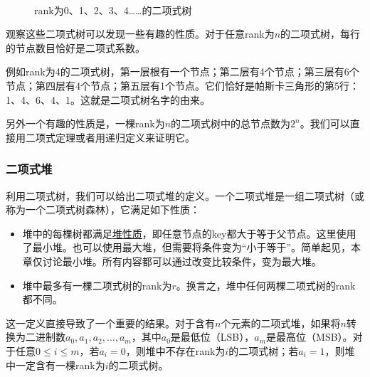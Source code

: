 \documentclass[UTF8]{article}
\begin{document}
\begin{figure}[htbp]
  \centering
   \\
  \caption{rank为0、1、2、3、4……的二项式树} \label{fig:bitree-forms}
\end{figure}

观察这些二项式树可以发现一些有趣的性质。对于任意rank为$n$的二项式树，每行的节点数目恰好是二项式系数。

例如rank为4的二项式树，第一层根有一个节点；第二层有4个节点；第三层有6个节点；第四层有4个节点；第五层有1个节点。它们恰好是帕斯卡三角形的第5行：1、4、6、4、1。这就是二项式树名字的由来。

另外一个有趣的性质是，一棵rank为$n$的二项式树中的总节点数为$2^n$。我们可以直接用二项式定理或者用递归定义来证明它。

\subsubsection{二项式堆}
\label{Binomial heap} 

利用二项式树，我们可以给出二项式堆的定义。一个二项式堆是一组二项式树（或称为一个二项式树森林），它满足如下性质：

\begin{itemize}
\item 堆中的每棵树都满足\underline{堆性质}，即任意节点的key都大于等于父节点。这里使用了最小堆。也可以使用最大堆，但需要将条件变为“小于等于”。简单起见，本章仅讨论最小堆。所有内容都可以通过改变比较条件，变为最大堆。
\item 堆中最多有一棵二项式树的rank为$r$。换言之，堆中任何两棵二项式树的rank都不同。
\end{itemize}

这一定义直接导致了一个重要的结果。对于含有$n$个元素的二项式堆，如果将$n$转换为二进制数$a_0, a_1, a_2, ..., a_m$，其中$a_0$是最低位（LSB），$a_m$是最高位（MSB）。对于任意$0 \leq i \leq m$，若$a_i=0$，则堆中不存在rank为$i$的二项式树；若$a_i = 1$，则堆中一定含有一棵rank为$i$的二项式树。
\end{document}
